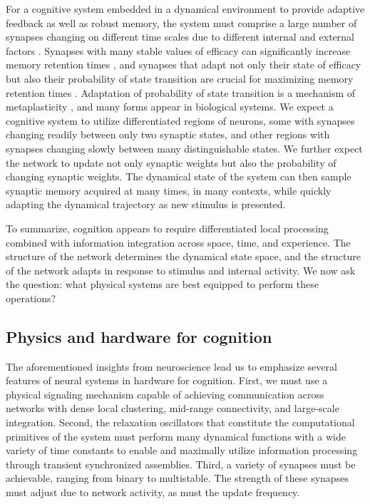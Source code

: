 \documentclass[twocolumn]{article}
\begin{document}
For a cognitive system embedded in a dynamical environment to provide adaptive feedback as well as robust memory, the system must comprise a large number of synapses changing on different time scales due to different internal and external factors \cite{fudr2005}. Synapses with many stable values of efficacy can significantly increase memory retention times \cite{fuab2007}, and synapses that adapt not only their state of efficacy but also their probability of state transition are crucial for maximizing memory retention times \cite{fudr2005,khso2017}. Adaptation of probability of state transition is a mechanism of metaplasticity \cite{ab2008}, and many forms appear in biological systems. We expect a cognitive system to utilize differentiated regions of neurons, some with synapses changing readily between only two synaptic states, and other regions with synapses changing slowly between many distinguishable states. We further expect the network to update not only synaptic weights but also the probability of changing synaptic weights. The dynamical state of the system can then sample synaptic memory acquired at many times, in many contexts, while quickly adapting the dynamical trajectory as new stimulus is presented.

To summarize, cognition appears to require differentiated local processing combined with information integration across space, time, and experience. The structure of the network determines the dynamical state space, and the structure of the network adapts in response to stimulus and internal activity. We now ask the question: what physical systems are best equipped to perform these operations?
	
\subsection{\label{sec:physicsAndHardware}Physics and hardware for cognition}
The aforementioned insights from neuroscience lead us to emphasize several features of neural systems in hardware for cognition. First, we must use a physical signaling mechanism capable of achieving communication across networks with dense local clustering, mid-range connectivity, and large-scale integration. Second, the relaxation oscillators that constitute the computational primitives of the system must perform many dynamical functions with a wide variety of time constants to enable and maximally utilize information processing through transient synchronized assemblies. Third, a variety of synapses must be achievable, ranging from binary to multistable. The strength of these synapses must adjust due to network activity, as must the update frequency.
\end{document}
